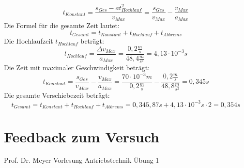 \documentclass[10pt,a4paper,oneside,abstracton]{scrartcl}
\begin{document}
\begin{equation}
	t_{Konstant} = \frac{s_{Ges} - a t^2_{Hochlauf}}{v_{Max}} =
	 \frac{s_{Ges}}{v_{Max}} - \frac{v_{Max}}{a_{Max}}
	\label{Formel t Konstant}
\end{equation}
Die Formel für die gesamte Zeit lautet: 
\begin{equation}
	t_{Gesamt} = t_{Konstant} + t_{Hochlauf} + t_{Abbrems} 
\end{equation}
\newline
Die Hochlaufzeit $t_{Hochlauf} $ beträgt: 
\begin{equation}
	t_{Hochlauf} = \frac{\Delta v_{Max}}{a_{Max}} = \frac{0,2 \frac{m}{s} }{48,4 \frac{m}{s^2} } = 4,13 \cdot 10^{-3}s
\end{equation}
Die Zeit mit maximaler Geschwindigkeit beträgt: 
\begin{equation}
t_{Konstant} = \frac{s_{Ges}}{v_{Max}} - \frac{v_{Max}}{a_{Max}} = 
\frac{70 \cdot 10^{-3} m} {0,2 \frac{m}{s} } 
- \frac{0,2 \frac{m}{s}}{48,8 \frac{m}{s^2}} = 0,345 s
\end{equation}
Die gesamte Verschiebezeit beträgt: 
\begin{equation}
	t_{Gesamt} = t_{Konstant} + t_{Hochlauf} + t_{Abbrems} = 0,345,87 s + 4,13 \cdot 10^{-3} s \cdot 2 = 0,354 s
\end{equation}
\section{Feedback zum Versuch}

\newpage

\listoffigures


\begin{thebibliography}{9}

	Prof. Dr. Meyer	Vorlesung Antriebstechnik Übung 1

\end{thebibliography}

 
\end{document}
